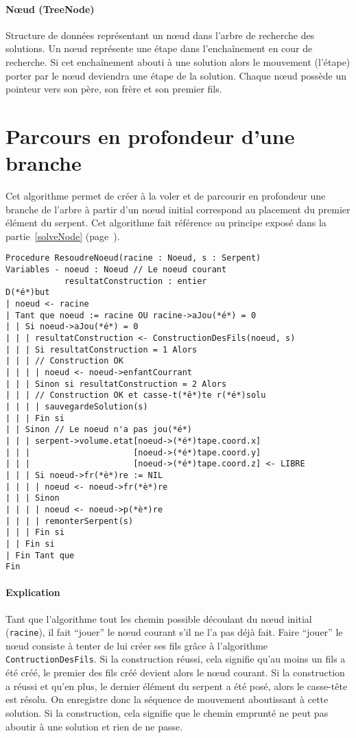 \paragraph{Nœud (TreeNode)} Structure de données représentant un nœud dans l'arbre de recherche des solutions. Un nœud représente une étape dans l'enchaînement en cour de recherche. Si cet enchaînement abouti à une solution alors le mouvement (l'étape) porter par le nœud deviendra une étape de la solution.
Chaque nœud possède un pointeur vers son père, son frère et son premier fils.

\section{Parcours en profondeur d'une branche}
Cet algorithme permet de créer à la voler et de parcourir en profondeur une branche de l'arbre à partir d'un nœud initial correspond au placement du premier élément du serpent. Cet algorithme fait référence au principe exposé dans la partie~\ref{solveNode} (page~\pageref{solveNode}).

\begin{lstlisting}[caption=Algorithme de résolution pour une branche]
Procedure ResoudreNoeud(racine : Noeud, s : Serpent)
Variables - noeud : Noeud // Le noeud courant
            resultatConstruction : entier
D(*é*)but
| noeud <- racine
| Tant que noeud := racine OU racine->aJou(*é*) = 0
| | Si noeud->aJou(*é*) = 0
| | | resultatConstruction <- ConstructionDesFils(noeud, s)
| | | Si resultatConstruction = 1 Alors
| | | // Construction OK
| | | | noeud <- noeud->enfantCourrant
| | | Sinon si resultatConstruction = 2 Alors
| | | // Construction OK et casse-t(*ê*)te r(*é*)solu 
| | | | sauvegardeSolution(s)
| | | Fin si
| | Sinon // Le noeud n'a pas jou(*é*)
| | | serpent->volume.etat[noeud->(*é*)tape.coord.x]
| | |                     [noeud->(*é*)tape.coord.y]
| | |                     [noeud->(*é*)tape.coord.z] <- LIBRE
| | | Si noeud->fr(*è*)re := NIL
| | | | noeud <- noeud->fr(*è*)re
| | | Sinon
| | | | noeud <- noeud->p(*è*)re
| | | | remonterSerpent(s)
| | | Fin si
| | Fin si
| Fin Tant que
Fin
\end{lstlisting}

\newpage
\paragraph{Explication}
Tant que l'algorithme tout les chemin possible découlant du nœud initial (\verb|racine|), il fait ``jouer'' le nœud courant s'il ne l'a pas déjà fait. Faire ``jouer'' le nœud consiste à tenter de lui créer ses fils grâce à l'algorithme \verb|ContructionDesFils|. Si la construction réussi, cela signifie qu'au moins un fils a été créé, le premier des fils créé devient alors le nœud courant. Si la construction a réussi et qu'en plus, le dernier élément du serpent a été posé, alors le casse-tête est résolu. On enregistre donc la séquence de mouvement aboutissant à cette solution. Si la construction, cela signifie que le chemin emprunté ne peut pas aboutir à une solution et rien de ne passe.


